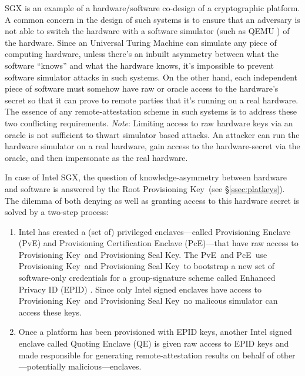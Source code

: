 \documentclass[letterpaper]{article}
\newcommand{\secref}[1]{\S\ref{#1}}
\newcommand{\pve}{\textsf{PvE}}
\newcommand{\pce}{\textsf{PcE}}
\newcommand{\qe}{\textsf{QE}}
\newcommand{\rpk}{\textsf{Root Provisioning Key}}
\newcommand{\pk}{\textsf{Provisioning Key}}
\newcommand{\psk}{\textsf{Provisioning Seal Key}}
\begin{document}
  SGX is an example of a hardware/software co-design of a
  cryptographic platform. A common concern in the design of such
  systems is to ensure that an adversary is not able to switch the
  hardware with a software simulator (such as QEMU \cite{qemu,
    opensgx}) of the hardware. Since an Universal Turing Machine can
  simulate any piece of computing hardware, unless there's an inbuilt
  asymmetry between what the software ``knows'' and what the hardware
  knows, it's impossible to prevent software simulator attacks in such
  systems. On the other hand, each independent piece of software must somehow have
  raw or oracle access to the hardware's secret so that it can prove to remote parties that it's running 
  on a real hardware. The essence of any
  remote-attestation scheme in such systems is to address these two
  conflicting requirements. {\em Note}: Limiting access to raw
  hardware keys via an oracle is not sufficient to thwart simulator
  based attacks. An attacker can run the hardware simulator on a real
  hardware, gain access to the hardware-secret via the oracle, and
  then impersonate as the real hardware.

  In case of Intel SGX, the question of knowledge-asymmetry between
  hardware and software is answered by the \rpk\ (see
  \secref{ssec:platkeys}). The dilemma of both denying as well as
  granting access to this hardware secret is solved by a two-step
  process:

  \begin{enumerate}
    \item Intel has created a (set of) privileged enclaves---called
      \textsf{Provisioning Enclave} (\pve) and \textsf{Provisioning
        Certification Enclave} (\pce)---that have raw
      access to \pk\ and \psk. The
      \pve\ and \pce\ use \pk\ and \psk\ to bootstrap a
      new set of software-only credentials for a group-signature scheme called
      Enhanced Privacy ID (EPID) \cite{epid}. Since only Intel signed enclaves have access to \pk\ and \psk\ no malicous simulator can access these keys. 

    \item Once a platform has been provisioned with EPID keys, another
      Intel signed enclave called \textsf{Quoting Enclave} (\qe) is
      given raw access to EPID keys and made responsible for
      generating remote-attestation results on behalf of other---potentially malicious---enclaves.

  \end{enumerate}
\end{document}
